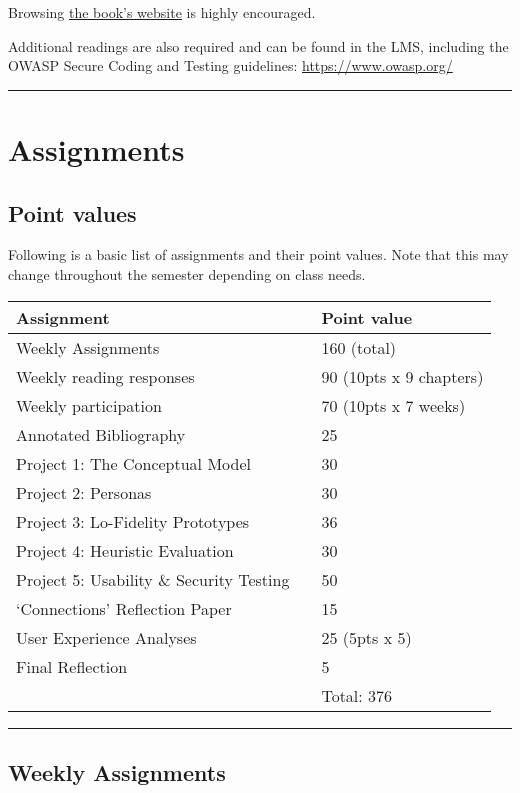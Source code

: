 \documentclass[]{article}
\begin{document}
Browsing \href{http://www.id-book.com/}{the book's website} is highly
encouraged.

Additional readings are also required and can be found in the LMS,
including the OWASP Secure Coding and Testing guidelines:
\url{https://www.owasp.org/}

\begin{center}\rule{0.5\linewidth}{\linethickness}\end{center}

\hypertarget{assignments}{%
\section{Assignments}\label{assignments}}

\hypertarget{point-values}{%
\subsection{Point values}\label{point-values}}

Following is a basic list of assignments and their point values. Note
that this may change throughout the semester depending on class needs.

\begin{longtable}[]{@{}lll@{}}
\toprule
Assignment & & Point value\tabularnewline
\midrule
\endhead
Weekly Assignments & & 160 (total)\tabularnewline
Weekly reading responses & & 90 (10pts x 9 chapters)\tabularnewline
Weekly participation & & 70 (10pts x 7 weeks)\tabularnewline
Annotated Bibliography & & 25\tabularnewline
Project 1: The Conceptual Model & & 30\tabularnewline
Project 2: Personas & & 30\tabularnewline
Project 3: Lo-Fidelity Prototypes & & 36\tabularnewline
Project 4: Heuristic Evaluation & & 30\tabularnewline
Project 5: Usability \& Security Testing & & 50\tabularnewline
`Connections' Reflection Paper & & 15\tabularnewline
User Experience Analyses & & 25 (5pts x 5)\tabularnewline
Final Reflection & & 5\tabularnewline
& & Total: 376\tabularnewline
\bottomrule
\end{longtable}

\begin{center}\rule{0.5\linewidth}{\linethickness}\end{center}

\hypertarget{weekly-assignments}{%
\subsection{Weekly Assignments}\label{weekly-assignments}}
\end{document}
